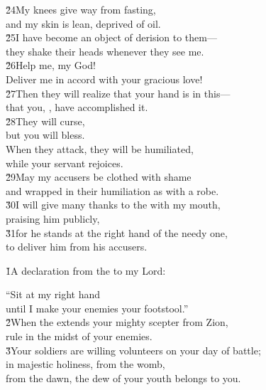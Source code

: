 \begin{poetry}
\poeml \v{24}My knees give way from fasting, \\
\poemll    and my skin is lean, deprived of oil. \\
\poeml \v{25}I have become an object of derision to them--- \\
\poemll    they shake their heads whenever they see me. \\
\poeml \v{26}Help me,  my God! \\
\poemll    Deliver me in accord with your gracious love! \\
\poeml \v{27}Then they will realize that your hand is in this--- \\
\poemll    that you, , have accomplished it. \\
\poeml \v{28}They will curse, \\
\poemll    but you will bless. \\
\poeml When they attack, they will be humiliated, \\
\poemll    while your servant rejoices. \\
\poeml \v{29}May my accusers be clothed with shame \\
\poemll    and wrapped in their humiliation as with a robe. \\
\poeml \v{30}I will give many thanks to the  with my mouth, \\
\poemll    praising him publicly, \\
\poeml \v{31}for he stands at the right hand of the needy one, \\
\poemll    to deliver him from his accusers.
\end{poetry}

\begin{poetry}
\poeml \v{1}A declaration from the  to my Lord:
\end{poetry}

\begin{poetry}
\poemll    ``Sit at my right hand \\
\poemlll       until I make your enemies your footstool.'' \\
\poeml \v{2}When the  extends your mighty scepter from Zion, \\
\poemll    rule in the midst of your enemies. \\
\poeml \v{3}Your soldiers are willing volunteers on your day of battle; \\
\poemll    in majestic holiness, from the womb, \\
\poemlll       from the dawn, the dew of your youth belongs to you.
\end{poetry}

